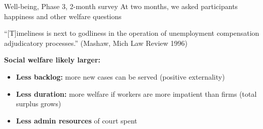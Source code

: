 \documentclass[9pt]{beamer}
\begin{document}






 
 



 \begin{frame}{Well-being, Phase 3, 2-month survey}
 At two months, we asked participants happiness and other welfare questions
    \begin{table}[H]
    \label{calc_template}
    \begin{center}
        \scriptsize{}
        \end{center}
\end{table}
\vspace{4mm}
``[T]imeliness is next to godliness in the operation of unemployment compensation adjudicatory processes.'' (Mashaw, Mich Law Review 1996)

\vspace{4mm}
\textbf{Social welfare likely larger:}
\begin{itemize}
    \item \textbf{Less backlog:} more new cases can be served (positive externality)
    \item \textbf{Less duration:} more welfare if workers are more impatient than firms (total surplus grows)
    \item \textbf{Less admin resources} of court spent
\end{itemize}

 \end{frame}



\end{document}
